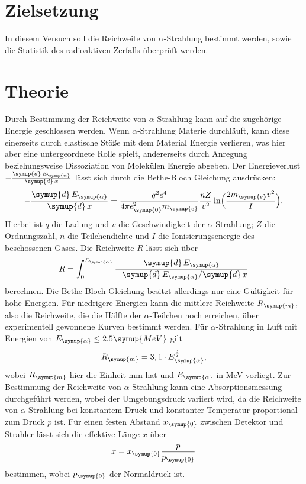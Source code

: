 \section{Zielsetzung}
    In diesem Versuch soll die Reichweite von $\alpha$-Strahlung bestimmt werden, sowie die Statistik des radioaktiven Zerfalls überprüft werden.
\section{Theorie}
\label{sec:Theorie}
    Durch Bestimmung der Reichweite von $\alpha$-Strahlung kann auf die zugehörige Energie geschlossen werden. Wenn $\alpha$-Strahlung
    Materie durchläuft, kann diese einerseits durch elastische Stöße mit dem Material Energie verlieren, was hier aber eine untergeordnete
    Rolle spielt, andererseits durch Anregung beziehungsweise Dissoziation von Molekülen Energie abgeben. Der Energieverlust
    $- \frac{\symup{d} \, E_{\symup{\alpha}}} {\symup{d} \, x}$ lässt sich durch die Bethe-Bloch Gleichung ausdrücken:
    \begin{equation}
    \label{eqn:bethe-bloch}
       - \frac{\symup{d} \, E_{\symup{\alpha}}} {\symup{d} \, x} = \frac{q^2 e^4} {4 \pi \epsilon_{\symup{0}}^2 m_{\symup{e}}} \frac{n Z} {v^2} \ln \Bigl( \frac{2 m_{\symup{e}} v^2 }{I} \Bigr).
   \end{equation}    
   Hierbei ist $q$ die Ladung und $v$ die Geschwindigkeit der $\alpha$-Strahlung; $Z$ die Ordnungszahl, $n$ die Teilchendichte und $I$ die 
   Ionisierungsenergie des beschossenen Gases. Die Reichweite $R$ lässt sich über 
   \begin{equation}
   \label{eqn:Reichweite}
        R = \int_0^{E_{\symup{\alpha}}} \frac{\symup{d} \, E_{\symup{\alpha}}} {-\symup{d} \, E_{\symup{\alpha}} / \symup{d} \, x  }
   \end{equation}
   berechnen. Die Bethe-Bloch Gleichung besitzt allerdings nur eine Gültigkeit für hohe Energien. Für niedrigere Energien kann die mittlere
   Reichweite $R_{\symup{m}}$, also die Reichweite, die die Hälfte der $\alpha$-Teilchen noch erreichen, über experimentell gewonnene Kurven bestimmt werden.
   Für $\alpha$-Strahlung in Luft mit Energien von $E_{\symup{\alpha}} \leq 2.5 \symup{MeV}$ gilt 
   \begin{equation}
   \label{eqn:mittlere-reichweite}
        R_{\symup{m}} = 3,1 \cdot E_{\symup{\alpha}}^{\frac{3}{2}}, 
   \end{equation}     
   wobei $ R_{\symup{m}} $ hier die Einheit mm hat und $E_{\symup{\alpha}}$ in MeV vorliegt.
   Zur Bestimmung der Reichweite von $\alpha$-Strahlung kann eine Absorptionsmessung durchgeführt werden, wobei der Umgebungsdruck variiert wird,
   da die Reichweite von $\alpha$-Strahlung bei konstantem Druck und konstanter Temperatur proportional zum Druck $p$ ist. Für einen 
   festen Abstand $x_{\symup{0}}$ zwischen Detektor und Strahler lässt sich die effektive Länge $x$ über 
   \begin{equation}
   \label{eqn:effektive-laenge}
        x = x_{\symup{0}} \frac{p}{p_{\symup{0}}}
   \end{equation}
   bestimmen, wobei $p_{\symup{0}}$ der Normaldruck ist.     